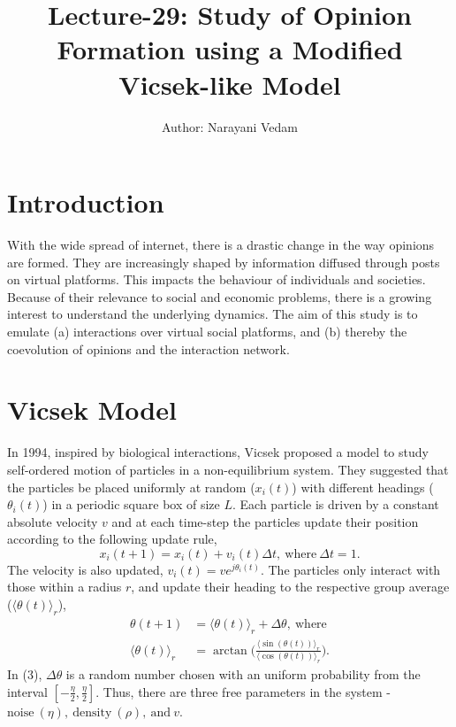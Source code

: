 \documentclass[letterpaper,english,11pt]{article}
\title{Lecture-29: Study of Opinion Formation using a Modified Vicsek-like Model}
\author{Author: Narayani Vedam}
\begin{document}
\maketitle
\section{Introduction}

 With the wide spread of internet, there is a drastic change in the way opinions are formed. They are increasingly shaped by information diffused through posts on virtual platforms. This impacts the behaviour of individuals and societies. Because of their relevance to social and economic problems, there is a growing interest to understand the underlying dynamics. The aim of this study is to emulate (a) interactions over virtual social platforms, and (b) thereby the coevolution of opinions and the interaction network.

\section{Vicsek Model}

In 1994, inspired by biological interactions, Vicsek proposed a model to study self-ordered motion of particles in a non-equilibrium system. They suggested that the particles be placed uniformly at random ($x_{i}(t)$) with different headings ($\theta_{i}(t)$) in a periodic square box of size $L$.  Each particle is driven by a constant absolute velocity $v$ and at each time-step the particles update their position according to the following update rule, 
\begin{equation}
x_{i}(t+1)= x_{i}(t)+ v_{i}(t)\Delta t,~\text{where}~\Delta t = 1.
 \end{equation}
The velocity is also updated, $v_{i}(t) = v e^{j\theta_{i}(t)}.$ The particles only interact with those within a radius $r$, and update their heading to the respective group average ($\langle \theta(t)\rangle_{r}$), 
\begin{align}
\theta(t+1) &= \langle \theta(t)\rangle_{r} +\Delta \theta,~\text{where} \\
\langle \theta(t)\rangle_{r} &= \arctan \bigg(\frac{\langle\sin(\theta(t))\rangle_{r}}{\langle\cos(\theta(t))\rangle_{r}}\bigg).
\end{align}
In (3), $\Delta \theta$ is a random number chosen with an uniform probability from the interval $[-\frac{\eta}{2},\frac{\eta}{2}]$. Thus, there are three free parameters in the system - $\text{noise}~(\eta),~\text{density}~(\rho),~\text{and}~v$. 
\end{document}

